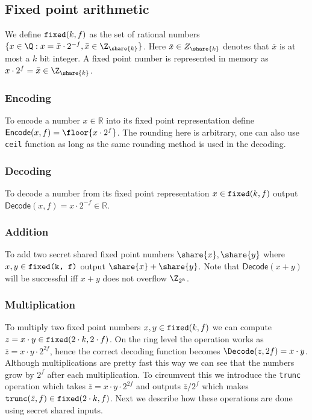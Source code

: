 \subsection{Fixed point arithmetic}
\label{subsec:fixed-point}

We define $\verb|fixed|(k, f)$ as the set of rational numbers $\{x \in
\Q : x = \bar{x} \cdot 2^{-f}, \bar{x} \in \Z_{\share{k}}\}$. Here $\bar{x}
\in Z_{\share{k}}$ denotes that $\bar{x}$ is at most a $k$ bit integer. A fixed point number
is represented in memory as $x \cdot 2^{f} = \bar{x} \in \Z_{\share{k}}$.

\subsubsection{Encoding} To encode a number $x \in \mathbb{R}$ into its fixed
point representation define $\mathsf{Encode}(x, f) = \floor{x \cdot 2^f}$.
The rounding here is arbitrary, one can also use \verb|ceil| function as long
as the same rounding method is used in the decoding.

\subsubsection{Decoding} To decode a number from its fixed point representation
$x \in \verb|fixed|(k, f)$ output $\mathsf{Decode}(x, f) = x \cdot 2^{-f} \in \mathbb{R}$.

\subsubsection{Addition} To add two secret shared fixed point numbers
$\share{x}, \share{y}$ where $x,y \in \verb|fixed(k, f)|$ output
$\share{x}+\share{y}$. Note that $\mathsf{Decode}(x+y)$ will be successful
iff $x+y$ does not overflow $\Z_{2^k}$.

\subsubsection{Multiplication}

To multiply two fixed point numbers $x, y \in \verb|fixed|(k, f)$ we can
compute $z = x \cdot y \in \verb|fixed|(2 \cdot k, 2\cdot f)$. On the ring
level the operation works as $\bar{z} = x \cdot y \cdot 2 ^ {2f}$, hence the
correct decoding function becomes $\Decode(z, 2f) = x \cdot y$. Although
multiplications are pretty fast this way we can see that the numbers grow by
$2^f$ after each multiplication. To circumvent this we introduce the
\verb|trunc| operation which takes $\bar{z} = x \cdot y \cdot 2^{2f}$ and outputs $\bar{z} / 2^{f}$
which makes $\verb|trunc|(\bar{z}, f) \in \verb|fixed|(2 \cdot k, f)$.
Next we describe how these operations are done using secret shared inputs.

